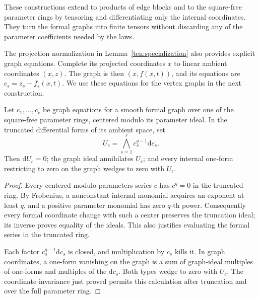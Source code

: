 These constructions extend to products of edge blocks and to the
square-free parameter rings by tensoring and differentiating only the
internal coordinates.  They turn the formal graphs into finite tensors
without discarding any of the parameter coefficients needed by the laws.

The projection normalization in Lemma~\ref{ten:specialization} also
provides explicit graph equations.  Complete its projected coordinates
\(x\) to linear ambient coordinates \((x,z)\).  The graph is then
\((x,f(x,t))\), and its equations are \(c_s=z_s-f_s(x,t)\).
We use these equations for the vertex graphs in the next construction.

\begin{lemma}\label{ten:graph-forms}
Let \(c_1,\ldots,c_r\) be graph equations for a smooth formal graph over
one of the square-free parameter rings, centered modulo its parameter
ideal.  In the truncated differential forms of its ambient space, set
\begin{equation}\label{ten:graph-form}
 U_c=\bigwedge_{s=1}^r c_s^{q-1}\mathrm dc_s.
\end{equation}
Then \(\mathrm dU_c=0\); the graph ideal annihilates \(U_c\); and every
internal one-form restricting to zero on the graph wedges to zero with
\(U_c\).
\end{lemma}

\begin{proof}
Every centered-modulo-parameters series \(c\) has \(c^q=0\) in the
truncated ring.  By Frobenius, a nonconstant internal monomial acquires
an exponent at least \(q\), and a positive parameter monomial has zero
\(q\)-th power.  Consequently every formal coordinate change with such
a center preserves the truncation ideal; its inverse proves equality of
the ideals.  This also justifies evaluating the formal series in the
truncated ring.

Each factor \(c_s^{q-1}\mathrm dc_s\) is closed, and multiplication by
\(c_s\) kills it.  In graph coordinates, a one-form vanishing on the graph
is a sum of graph-ideal multiples of one-forms and multiples of the
\(\mathrm dc_s\).  Both types wedge to zero with \(U_c\).  The coordinate
invariance just proved permits this calculation after truncation and
over the full parameter ring.
\end{proof}


